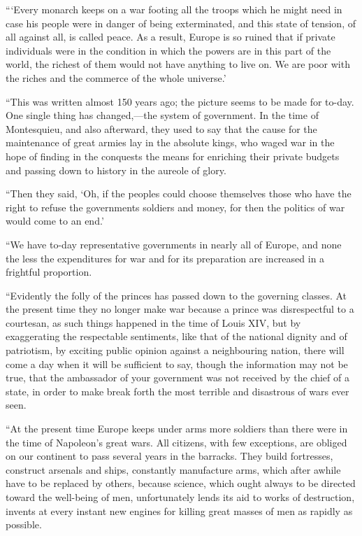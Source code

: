 \documentclass{book}
\begin{document}
“‘Every monarch keeps on a war footing all the troops which he might need in case his people were in danger of being exterminated, and this state of tension, of all against all, is called peace. As a result, Europe is so ruined that if private individuals were in the condition in which the powers are in this part of the world, the richest of them would not have anything to live on. We are poor with the riches and the commerce of the whole universe.’

“This was written almost 150 years ago; the picture seems to be made for to-day. One single thing has changed,—the system of government. In the time of Montesquieu, and also afterward, they used to say that the cause for the maintenance of great armies lay in the absolute kings, who waged war in the hope of finding in the conquests the means for enriching their private budgets and passing down to history in the aureole of glory.

“Then they said, ‘Oh, if the peoples could choose themselves those who have the right to refuse the governments soldiers and money, for then the politics of war would come to an end.’

“We have to-day representative governments in nearly all of Europe, and none the less the expenditures for war and for its preparation are increased in a frightful proportion.

“Evidently the folly of the princes has passed down to the governing classes. At the present time they no longer make war because a prince was disrespectful to a courtesan, as such things happened in the time of Louis XIV, but by exaggerating the respectable sentiments, like that of the national dignity and of patriotism, by exciting public opinion against a neighbouring nation, there will come a day when it will be sufficient to say, though the information may not be true, that the ambassador of your government was not received by the chief of a state, in order to make break forth the most terrible and disastrous of wars ever seen.

“At the present time Europe keeps under arms more soldiers than there were in the time of Napoleon’s great wars. All citizens, with few exceptions, are obliged on our continent to pass several years in the barracks. They build fortresses, construct arsenals and ships, constantly manufacture arms, which after awhile have to be replaced by others, because science, which ought always to be directed toward the well-being of men, unfortunately lends its aid to works of destruction, invents at every instant new engines for killing great masses of men as rapidly as possible.
\end{document}
